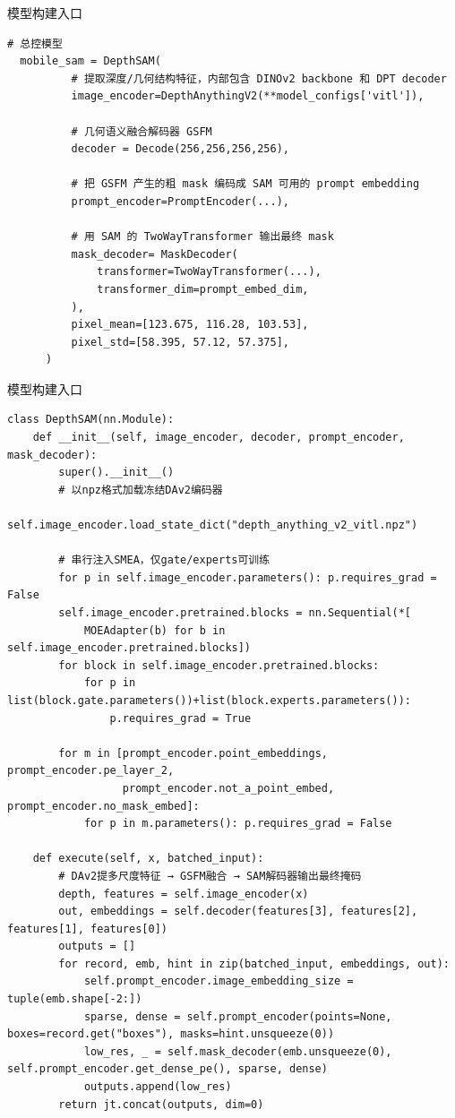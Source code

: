\begin{frame}[fragile]{模型构建入口}
\begin{lstlisting}[style=pythoncode,basicstyle=\ttfamily\tiny]
# 总控模型
  mobile_sam = DepthSAM(
          # 提取深度/几何结构特征，内部包含 DINOv2 backbone 和 DPT decoder
          image_encoder=DepthAnythingV2(**model_configs['vitl']),
          
          # 几何语义融合解码器 GSFM
          decoder = Decode(256,256,256,256),

          # 把 GSFM 产生的粗 mask 编码成 SAM 可用的 prompt embedding
          prompt_encoder=PromptEncoder(...),

          # 用 SAM 的 TwoWayTransformer 输出最终 mask
          mask_decoder= MaskDecoder(
              transformer=TwoWayTransformer(...),
              transformer_dim=prompt_embed_dim,
          ),
          pixel_mean=[123.675, 116.28, 103.53],
          pixel_std=[58.395, 57.12, 57.375],
      )
\end{lstlisting}
\end{frame}

\begin{frame}[fragile]{模型构建入口}
\begin{lstlisting}[style=pythoncode,basicstyle=\ttfamily\tiny]
class DepthSAM(nn.Module):
    def __init__(self, image_encoder, decoder, prompt_encoder, mask_decoder):
        super().__init__()
        # 以npz格式加载冻结DAv2编码器
        self.image_encoder.load_state_dict("depth_anything_v2_vitl.npz")

        # 串行注入SMEA，仅gate/experts可训练
        for p in self.image_encoder.parameters(): p.requires_grad = False
        self.image_encoder.pretrained.blocks = nn.Sequential(*[
            MOEAdapter(b) for b in self.image_encoder.pretrained.blocks])
        for block in self.image_encoder.pretrained.blocks:
            for p in list(block.gate.parameters())+list(block.experts.parameters()):
                p.requires_grad = True        

        for m in [prompt_encoder.point_embeddings, prompt_encoder.pe_layer_2,
                  prompt_encoder.not_a_point_embed, prompt_encoder.no_mask_embed]:
            for p in m.parameters(): p.requires_grad = False

    def execute(self, x, batched_input):
        # DAv2提多尺度特征 → GSFM融合 → SAM解码器输出最终掩码
        depth, features = self.image_encoder(x)
        out, embeddings = self.decoder(features[3], features[2], features[1], features[0])
        outputs = []
        for record, emb, hint in zip(batched_input, embeddings, out):
            self.prompt_encoder.image_embedding_size = tuple(emb.shape[-2:])
            sparse, dense = self.prompt_encoder(points=None, boxes=record.get("boxes"), masks=hint.unsqueeze(0))
            low_res, _ = self.mask_decoder(emb.unsqueeze(0), self.prompt_encoder.get_dense_pe(), sparse, dense)
            outputs.append(low_res)
        return jt.concat(outputs, dim=0)
\end{lstlisting}
\end{frame}

